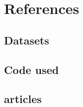 \documentclass[Report.tex]{subfiles}
\begin{document}
\chapter{References}
\label{chap:References}
\section{Datasets}
\section{Code used}
\section{articles}
\end{document}
